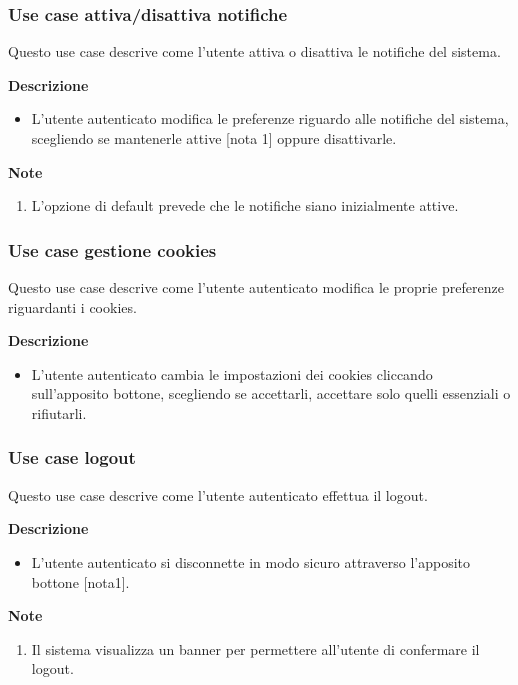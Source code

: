\documentclass[a4paper,12pt]{article}
\begin{document}
\subsubsection*{Use case attiva/disattiva notifiche}

Questo use case descrive come l'utente attiva o disattiva le notifiche del sistema.

\textbf{Descrizione}
\begin{itemize} \setlength\itemsep{0.01em}
\item L'utente autenticato modifica le preferenze riguardo alle notifiche del sistema, scegliendo se mantenerle attive [nota 1] oppure disattivarle.
\end{itemize}

\textbf{Note}
\begin{enumerate} \setlength\itemsep{0.01em}
\item L'opzione di default prevede che le notifiche siano inizialmente attive.
\end{enumerate}

\subsubsection*{Use case gestione cookies}

Questo use case descrive come l'utente autenticato modifica le proprie preferenze riguardanti i cookies.

\textbf{Descrizione}
\begin{itemize} \setlength\itemsep{0.01em}
\item L'utente autenticato cambia le impostazioni dei cookies cliccando sull'apposito bottone, scegliendo se accettarli, accettare solo quelli essenziali o rifiutarli.
\end{itemize}

\subsubsection*{Use case logout}

Questo use case descrive come l'utente autenticato effettua il logout.

\textbf{Descrizione}
\begin{itemize} \setlength\itemsep{0.01em}
\item L'utente autenticato si disconnette in modo sicuro attraverso l'apposito bottone [nota1].
\end{itemize}

\textbf{Note}
\begin{enumerate} \setlength\itemsep{0.01em}
\item Il sistema visualizza un banner per permettere all'utente di confermare il logout.
\end{enumerate}
\end{document}
